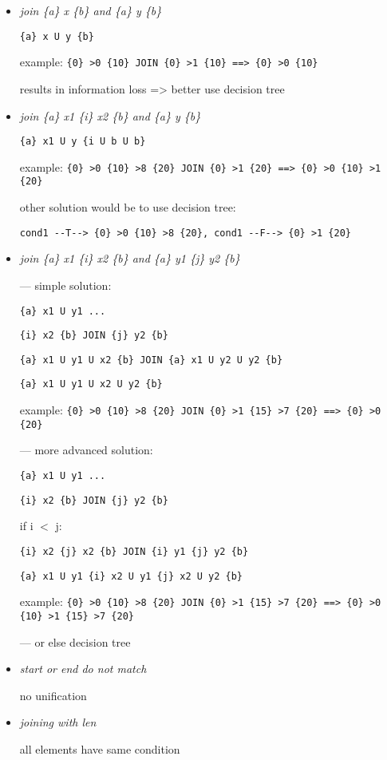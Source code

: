 \documentclass[11pt]{article}
\begin{document}
\begin{itemize}

\item \textit{join \{a\} x \{b\} and \{a\} y \{b\}}

\verb|{a} x U y {b}|

example: \verb|{0} >0 {10} JOIN {0} >1 {10} ==> {0} >0 {10}|

results in information loss => better use decision tree


\item \textit{join \{a\} x1 \{i\} x2 \{b\} and \{a\} y \{b\}}

\verb|{a} x1 U y {i U b U b}|

example: \verb|{0} >0 {10} >8 {20} JOIN {0} >1 {20} ==> {0} >0 {10} >1 {20}|

other solution would be to use decision tree: 

\verb|cond1 --T--> {0} >0 {10} >8 {20}, cond1 --F--> {0} >1 {20}|


\item \textit{join \{a\} x1 \{i\} x2 \{b\} and \{a\} y1 \{j\} y2 \{b\}}

--- simple solution:

\verb|{a} x1 U y1 ...|

\verb|{i} x2 {b} JOIN {j} y2 {b}|

\verb|{a} x1 U y1 U x2 {b} JOIN {a} x1 U y2 U y2 {b}|

\verb|{a} x1 U y1 U x2 U y2 {b}|

example: \verb|{0} >0 {10} >8 {20} JOIN {0} >1 {15} >7 {20} ==> {0} >0 {20}|

--- more advanced solution:

\verb|{a} x1 U y1 ...|

\verb|{i} x2 {b} JOIN {j} y2 {b}|

if i $<$ j: 

\verb|{i} x2 {j} x2 {b} JOIN {i} y1 {j} y2 {b}|

\verb|{a} x1 U y1 {i} x2 U y1 {j} x2 U y2 {b}|

example: \verb|{0} >0 {10} >8 {20} JOIN {0} >1 {15} >7 {20} ==> {0} >0 {10} >1 {15} >7 {20}|

--- or else decision tree


\item \textit{start or end do not match}

no unification


\item \textit{joining with len}

all elements have same condition


\end{itemize}
\end{document}
